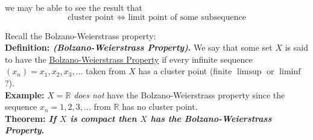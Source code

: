 \documentclass[12pt]{article}
\newcommand{\R}{\mathbb R}
\begin{document}
we may be able to see the result that
\begin{equation*}
	\text{cluster point $\iff$ limit point of some subsequence}
\end{equation*}

Recall the Bolzano-Weierstrass property: \\

%
%
{\bf Definition: {\em (Bolzano-Weierstrass Property)}.} We say that some set $X$ is said to have the \underline{Bolzano-Weierstrass Property} if every infinite sequence $(x_n) = x_1, x_2, x_3, ...$ taken from $X$ has a cluster point (finite $\limsup$ or $\liminf$?). \\

%
% 
{\bf Example:} $X = \R$ {\em does not} have the Bolzano-Weierstrass property since the sequence $x_n = 1, 2, 3, ...$ from $\R$ has no cluster point. \\

%
% 
{\bf Theorem: {\em If $X$ is compact then $X$ has the Bolzano-Weierstrass Property}.}
\end{document}
